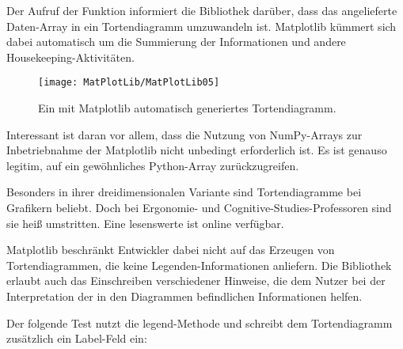 \medskip





\medskip


Der Aufruf der Funktion  informiert die Bibliothek darüber, dass das angelieferte Daten-Array in ein Tortendiagramm umzuwandeln ist. Matplotlib kümmert sich dabei automatisch um die Summierung der Informationen und andere Housekeeping-Aktivitäten.

\begin{figure}
  \begin{center}  
    \texttt{[image: MatPlotLib/MatPlotLib05]}      
        
    \caption{Ein mit Matplotlib automatisch generiertes Tortendiagramm.}\label{Matplotlib05}
  \end{center}    
\end{figure}


Interessant ist daran vor allem, dass die Nutzung von NumPy-Arrays zur Inbetriebnahme der Matplotlib nicht unbedingt erforderlich ist. Es ist genauso legitim, auf ein gewöhnliches Python-Array zurückzugreifen.

Besonders in ihrer dreidimensionalen Variante sind Tortendiagramme bei Grafikern beliebt. Doch bei Ergonomie- und Cognitive-Studies-Professoren sind sie heiß umstritten. Eine lesenswerte  ist online verfügbar.

Matplotlib beschränkt Entwickler dabei nicht auf das Erzeugen von Tortendiagrammen, die keine Legenden-Informationen anliefern. Die Bibliothek erlaubt auch das Einschreiben verschiedener Hinweise, die dem Nutzer bei der Interpretation der in den Diagrammen befindlichen Informationen helfen.

Der folgende Test nutzt die legend-Methode und schreibt dem Tortendiagramm zusätzlich ein Label-Feld ein:

\medskip





\medskip

